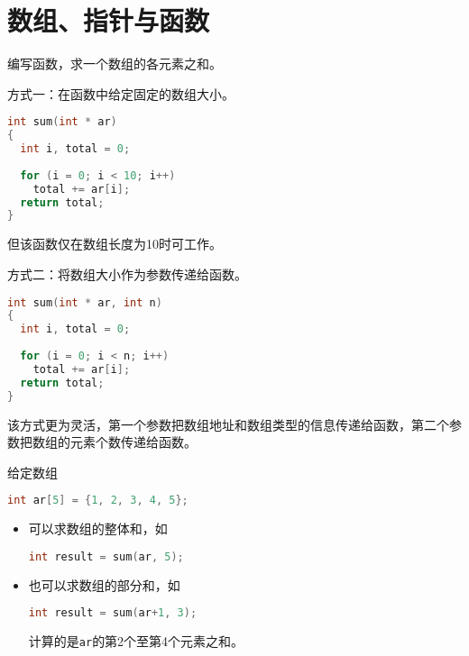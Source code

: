 \section{数组、指针与函数}

\begin{frame}[fragile]\ft{\secname}
编写函数，求一个数组的各元素之和。
\end{frame}

\begin{frame}[fragile]\ft{\secname}
方式一：在函数中给定固定的数组大小。
\begin{lstlisting}[language=c,backgroundcolor=\color{red!20}]
int sum(int * ar)
{
  int i, total = 0;
  
  for (i = 0; i < 10; i++)
    total += ar[i];  
  return total;  
}
\end{lstlisting} \pause 
但该函数仅在数组长度为10时可工作。
\end{frame}

\begin{frame}[fragile]\ft{\secname}
方式二：将数组大小作为参数传递给函数。
\begin{lstlisting}[language=c,backgroundcolor=\color{red!20}]
int sum(int * ar, int n)
{
  int i, total = 0;
  
  for (i = 0; i < n; i++)
    total += ar[i];  
  return total;  
}
\end{lstlisting} \pause 
该方式更为灵活，第一个参数把数组地址和数组类型的信息传递给函数，第二个参数把数组的元素个数传递给函数。
\end{frame}

\begin{frame}[fragile]\ft{\secname}
给定数组
\begin{lstlisting}[language=c,backgroundcolor=\color{red!20},frame=no]
int ar[5] = {1, 2, 3, 4, 5};
\end{lstlisting}
\begin{itemize}
\item 可以求数组的整体和，如
\begin{lstlisting}[language=c,backgroundcolor=\color{red!20},frame=no]
int result = sum(ar, 5);
\end{lstlisting}
\item 也可以求数组的部分和，如
\begin{lstlisting}[language=c,backgroundcolor=\color{red!20},frame=no]
int result = sum(ar+1, 3);
\end{lstlisting}
计算的是\lstinline|ar|的第2个至第4个元素之和。
\end{itemize}

\end{frame}




